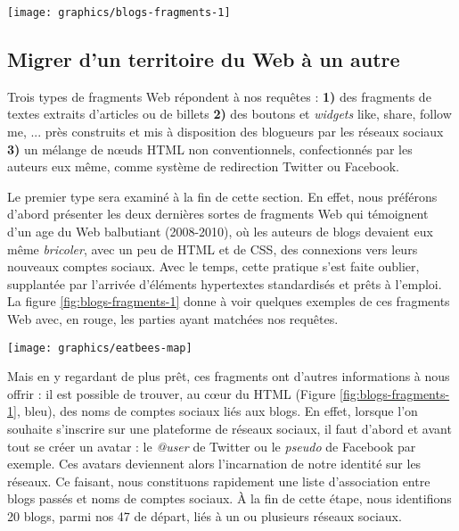 \documentclass[symmetric,justified,marginals=raggedouter]{tufte-book}
\begin{document}
\begin{figure*}
  \texttt{[image: graphics/blogs-fragments-1]}
  \caption{Exemples de fragments Web associés à divers réseaux sociaux}
  \label{fig:blogs-fragments-1}
\end{figure*} 

\subsection{Migrer d'un territoire du Web à un autre}

\noindent Trois types de fragments Web répondent à nos requêtes : \textbf{1)} des fragments de textes extraits d'articles ou de billets \textbf{2)} des boutons et \textit{widgets} like, share, follow me, ... près construits et mis à disposition des blogueurs par les réseaux sociaux \textbf{3)} un mélange de nœuds HTML non conventionnels, confectionnés par les auteurs eux même, comme système de redirection Twitter ou Facebook. 

Le premier type sera examiné à la fin de cette section. En effet, nous préférons d'abord présenter les deux dernières sortes de fragments Web qui témoignent d'un age du Web balbutiant (2008-2010), où les auteurs de blogs devaient eux même \textit{bricoler}, avec un peu de HTML et de CSS, des connexions vers leurs nouveaux comptes sociaux. Avec le temps, cette pratique s'est faite oublier, supplantée par l'arrivée d'éléments hypertextes standardisés et prêts à l'emploi. La figure \ref{fig:blogs-fragments-1} donne à voir quelques exemples de ces fragments Web avec, en rouge, les parties ayant matchées nos requêtes. 

\begin{marginfigure}%
  \texttt{[image: graphics/eatbees-map]}
  \vspace*{0.2cm}  
  \caption{\textit{eatbess.com} (rouge) dans l'e-Diaspora marocaine}
  \label{fig:eatbees-map}
\end{marginfigure} 

Mais en y regardant de plus prêt, ces fragments ont d'autres informations à nous offrir : il est possible de trouver, au cœur du HTML (Figure \ref{fig:blogs-fragments-1}, bleu), des noms de comptes sociaux liés aux blogs. En effet, lorsque l'on souhaite s'inscrire sur une plateforme de réseaux sociaux, il faut d'abord et avant tout se créer un avatar : le \textit{@user} de Twitter ou le \textit{pseudo} de Facebook par exemple. Ces avatars deviennent alors l'incarnation de notre identité sur les réseaux. Ce faisant, nous constituons rapidement une liste d'association entre blogs passés et noms de comptes sociaux. À la fin de cette étape, nous identifions 20 blogs, parmi nos 47 de départ, liés à un ou plusieurs réseaux sociaux.
\end{document}
